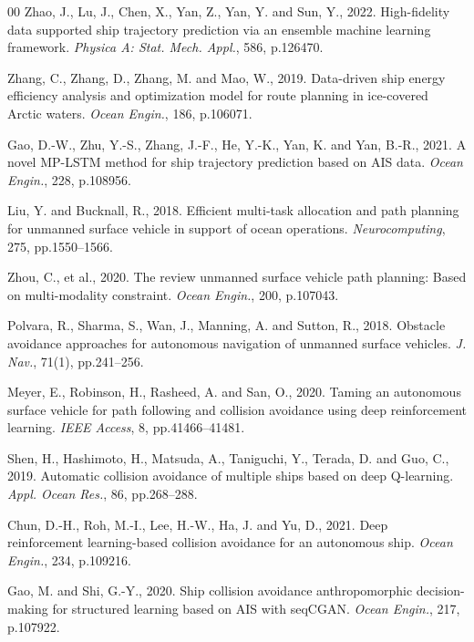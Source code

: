 \documentclass[final,5p,times,twocolumn]{elsarticle}
\begin{document}
\begin{thebibliography}{00}
Zhao, J., Lu, J., Chen, X., Yan, Z., Yan, Y. and Sun, Y., 2022. High-fidelity data supported ship trajectory prediction via an ensemble machine learning framework. \textit{Physica A: Stat. Mech. Appl.}, 586, p.126470.

Zhang, C., Zhang, D., Zhang, M. and Mao, W., 2019. Data-driven ship energy efficiency analysis and optimization model for route planning in ice-covered Arctic waters. \textit{Ocean Engin.}, 186, p.106071.

Gao, D.-W., Zhu, Y.-S., Zhang, J.-F., He, Y.-K., Yan, K. and Yan, B.-R., 2021. A novel MP-LSTM method for ship trajectory prediction based on AIS data. \textit{Ocean Engin.}, 228, p.108956.

Liu, Y. and Bucknall, R., 2018. Efficient multi-task allocation and path planning for unmanned surface vehicle in support of ocean operations. \textit{Neurocomputing}, 275, pp.1550–1566.

Zhou, C., et al., 2020. The review unmanned surface vehicle path planning: Based on multi-modality constraint. \textit{Ocean Engin.}, 200, p.107043.

Polvara, R., Sharma, S., Wan, J., Manning, A. and Sutton, R., 2018. Obstacle avoidance approaches for autonomous navigation of unmanned surface vehicles. \textit{J. Nav.}, 71(1), pp.241–256.

Meyer, E., Robinson, H., Rasheed, A. and San, O., 2020. Taming an autonomous surface vehicle for path following and collision avoidance using deep reinforcement learning. \textit{IEEE Access}, 8, pp.41466–41481.

Shen, H., Hashimoto, H., Matsuda, A., Taniguchi, Y., Terada, D. and Guo, C., 2019. Automatic collision avoidance of multiple ships based on deep Q-learning. \textit{Appl. Ocean Res.}, 86, pp.268–288.

Chun, D.-H., Roh, M.-I., Lee, H.-W., Ha, J. and Yu, D., 2021. Deep reinforcement learning-based collision avoidance for an autonomous ship. \textit{Ocean Engin.}, 234, p.109216.

Gao, M. and Shi, G.-Y., 2020. Ship collision avoidance anthropomorphic decision-making for structured learning based on AIS with seqCGAN. \textit{Ocean Engin.}, 217, p.107922.


\end{thebibliography}
\end{document}
